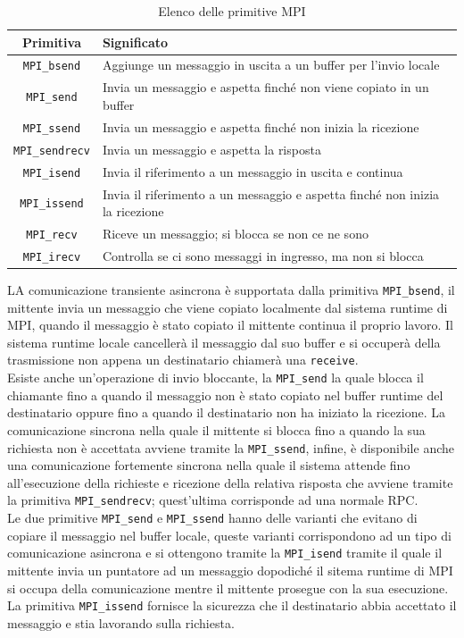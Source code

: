 \begin{table}
\centering
\begin{tabular}{|c|l|}
\hline
\textbf{Primitiva} & \textbf{Significato} \\
\hline
\texttt{MPI\_bsend} & Aggiunge un messaggio in uscita a un buffer per l'invio locale \\
\texttt{MPI\_send} & Invia un messaggio e aspetta finché non viene copiato in un buffer\\
\texttt{MPI\_ssend} & Invia un messaggio e aspetta finché non inizia la ricezione\\
\texttt{MPI\_sendrecv} & Invia un messaggio e aspetta la risposta \\
\texttt{MPI\_isend} & Invia il riferimento a un messaggio in uscita e continua \\
\texttt{MPI\_issend} & Invia il riferimento a un messaggio e aspetta finché non inizia la ricezione \\
\texttt{MPI\_recv} & Riceve un messaggio; si blocca se non ce ne sono \\
\texttt{MPI\_irecv} & Controlla se ci sono messaggi in ingresso, ma non si blocca \\
\hline
\end{tabular}
\caption{Elenco delle primitive MPI}\label{tab:mpi}
\end{table}
LA comunicazione transiente asincrona è supportata dalla primitiva \texttt{MPI\_bsend}, il mittente invia un messaggio che viene copiato localmente dal sistema runtime di MPI, quando il messaggio è stato copiato il mittente continua il proprio lavoro. Il sistema runtime locale cancellerà il messaggio dal suo buffer e si occuperà della trasmissione non appena un destinatario chiamerà una \texttt{receive}.\\
Esiste anche un'operazione di invio bloccante, la \texttt{MPI\_send} la quale blocca il chiamante fino a quando il messaggio non è stato copiato nel buffer runtime del destinatario oppure fino a quando il destinatario non ha iniziato la ricezione. La comunicazione sincrona nella quale il mittente si blocca fino a quando la sua richiesta non è accettata avviene tramite la \texttt{MPI\_ssend}, infine, è disponibile anche una comunicazione fortemente sincrona nella quale il sistema attende fino all'esecuzione della richieste e ricezione della relativa risposta che avviene tramite la primitiva \texttt{MPI\_sendrecv}; quest'ultima corrisponde ad una normale RPC.\\
Le due primitive \texttt{MPI\_send} e \texttt{MPI\_ssend} hanno delle varianti che evitano di copiare il messaggio nel buffer locale, queste varianti corrispondono ad un tipo di comunicazione asincrona e si ottengono tramite la \texttt{MPI\_isend} tramite il quale il mittente invia un puntatore ad un messaggio dopodiché il sitema runtime di MPI si occupa della comunicazione mentre il mittente prosegue con la sua esecuzione. La primitiva \texttt{MPI\_issend} fornisce la sicurezza che il destinatario abbia accettato il messaggio e stia lavorando sulla richiesta.\\
